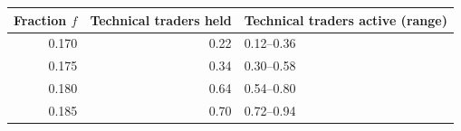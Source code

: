\begin{center}
\begin{minipage}{\linewidth}\centering
\captionsetup{type=table,hypcap=false}
\caption{Probability of a Sell majority after changes in trader cash and shares over 50 starting markets and 3,000 post-switch steps. Each fraction includes 27 combinations of cash, shares, and dealer depth. With technical traders held, the probability was the same across those combinations; with technical traders active, it spanned the stated range.}
\label{tab:balance-fractions}
\small
\begin{tabular}{rrl}
\toprule
Fraction $f$ & Technical traders held & Technical traders active (range) \\
\midrule
0.170 & 0.22 & 0.12--0.36 \\
0.175 & 0.34 & 0.30--0.58 \\
0.180 & 0.64 & 0.54--0.80 \\
0.185 & 0.70 & 0.72--0.94 \\
\bottomrule
\end{tabular}
\end{minipage}
\end{center}
